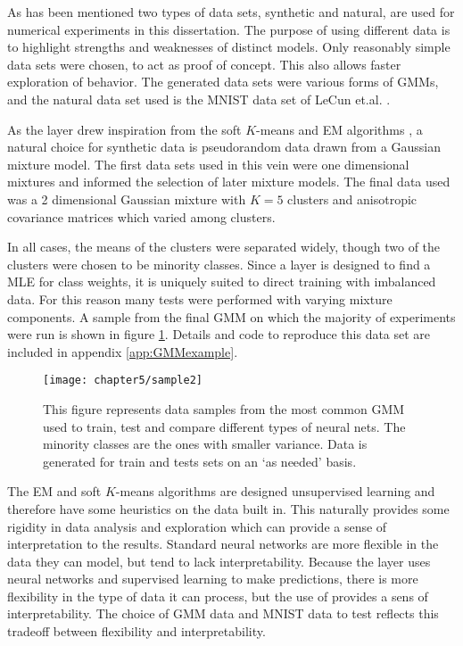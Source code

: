 \label{sect:dataSelection}

As has been mentioned two types of data sets, synthetic and natural, are used for numerical experiments in this dissertation. The purpose of using different data is to highlight strengths and weaknesses of distinct models. Only reasonably simple data sets were chosen, to act as proof of concept. This also allows faster exploration of \RS behavior. The generated data sets were various forms of GMMs, and the natural data set used is the MNIST data set of LeCun et.al. \cite{lecun1998gradient}.

As the \RS layer drew inspiration from the soft \( K \)-means and EM algorithms \cite{MacKay2002}, a natural choice for synthetic data is pseudorandom data drawn from a Gaussian mixture model. The first data sets used in this vein were one dimensional mixtures and informed the selection of later mixture models. The final data used was a 2 dimensional Gaussian mixture with \( K=5 \) clusters and anisotropic covariance matrices which varied among clusters.  

In all cases, the means of the clusters were separated widely, though two of the clusters were chosen to be minority classes.  Since a \RS layer is designed to find a MLE for class weights, it is uniquely suited to direct training with imbalanced data. For this reason many tests were performed with varying mixture components. A sample from the final GMM on which the majority of experiments were run is shown in figure \ref{fig:sampleGMM_K5}.  Details and code to reproduce this data set are included in appendix \ref{app:GMMexample}.

\begin{figure}[h]
	\centering
	\texttt{[image: chapter5/sample2]}
	\caption[A sample GMM data set used for training and testing]{This figure represents data samples from the most common GMM used to train, test and compare different types of neural nets. The minority classes are the ones with smaller variance. Data is generated for train and tests sets on an `as needed' basis.}
	\label{fig:sampleGMM_K5}
\end{figure}

The EM and soft \( K \)-means algorithms are designed unsupervised learning and therefore have some heuristics on the data built in. This naturally provides some rigidity in data analysis and exploration which can provide a sense of interpretation to the results. Standard neural networks are more flexible in the data they can model, but tend to lack interpretability. Because the \RS layer uses neural networks and supervised learning to make predictions, there is more flexibility in the type of data it can process, but the use of \DR provides a sens of interpretability.  The choice of GMM data and MNIST data to test \RS reflects this tradeoff between flexibility and interpretability.

